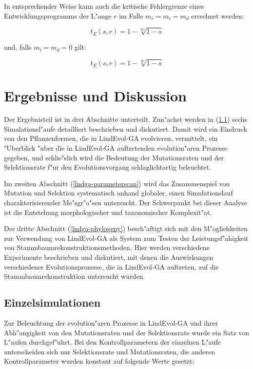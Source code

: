In entsprechender Weise kann auch die kritische Fehlergrenze eines Entwicklungsprogramms der L"ange $r$ im Falle $m_r = m_i = m_d$
errechnet werden:

\begin{equation}
\label{errthresholdprgm-eq}
t_E(s,r) = 1-\sqrt[6r]{1-s}
\end{equation}

und, falls $m_i = m_d = 0$ gilt:

\begin{equation}
\label{errthresholdprgr-eq}
t_E(s,r) = 1-\sqrt[2r]{1-s}
\end{equation}


\section{Ergebnisse und Diskussion}
\label{lndga-results}

Der Ergebnisteil ist in drei Abschnitte unterteilt. Zun"achst werden in (\ref{lndga-individualsims}) sechs
Simulationsl"aufe detailliert beschrieben und diskutiert. Damit wird ein Eindruck von den Pflanzenformen,
die in LindEvol-GA evolvieren, vermittelt, ein "Uberblick "uber die in LindEvol-GA auftretenden
evolution"aren Prozesse gegeben, und schlie"slich wird die Bedeutung der Mutationsraten und der Selektionsrate
f"ur den Evolutionsvorgang schlaglichtartig beleuchtet.

Im zweiten Abschnitt (\ref{lndga-parameterscan}) wird das Zusammenspiel von Mutation und Selektion systematisch anhand globaler,
einen Simulationslauf charakterisierender Me"sgr"o"sen untersucht. Der Schwerpunkt bei dieser Analyse ist
die Entstehung morphologischer und taxonomischer Komplexit"at.

Der dritte Abschnitt (\ref{lndga-phylogeny}) besch"aftigt sich mit den M"oglichkeiten zur Verwendung von LindEvol-GA als
System zum Testen der Leistungsf"ahigkeit von Stammbaumrekonstruktionsmethoden. Hier werden verschiedene
Experimente beschrieben und diskutiert, mit denen die Auswirkungen verschiedener Evolutionsprozesse,
die in LindEvol-GA auftreten, auf die Stammbaumrekonstruktion untersucht wurden.


\subsection{Einzelsimulationen}
\label{lndga-individualsims}

Zur Beleuchtung der evolution"aren Prozesse in LindEvol-GA und ihrer Abh"angigkeit von den
Mutationsraten und der Selektionsrate wurde ein Satz von L"aufen durchgef"uhrt. Bei den Kontrollparametern
der einzelnen L"aufe unterscheiden sich nur Selektionsrate und Mutationsraten, die anderen
Kontrollparameter wurden konstant auf folgende Werte gesetzt:

